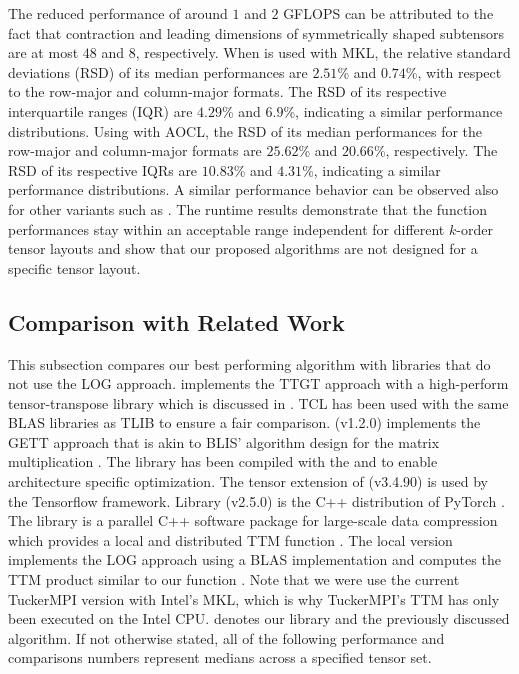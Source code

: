 The reduced performance of around $1$ and $2$ GFLOPS can be attributed to the fact that contraction and leading dimensions of symmetrically shaped subtensors are at most $48$ and $8$, respectively.
When  is used with MKL, the relative standard deviations (RSD) of its median performances are $2.51$\% and $0.74$\%, with respect to the row-major and column-major formats.
The RSD of its respective interquartile ranges (IQR) are $4.29$\% and $6.9$\%, indicating a similar performance distributions.
Using  with AOCL, the RSD of its median performances for the row-major and column-major formats are $25.62$\% and $20.66$\%, respectively.
The RSD of its respective IQRs are $10.83$\% and $4.31$\%, indicating a similar performance distributions.
A similar performance behavior can be observed also for other  variants such as .
The runtime results demonstrate that the function performances stay within an acceptable range independent for different $k$-order tensor layouts and show that our proposed algorithms are not designed for a specific tensor layout.






\subsection{Comparison with Related Work}
This subsection compares our best performing algorithm with libraries that do not use the LOG approach.
 implements the TTGT approach with a high-perform tensor-transpose library  which is discussed in \cite{springer:2018:design}.
TCL has been used with the same BLAS libraries as TLIB to ensure a fair comparison.
 (v1.2.0) implements the GETT approach that is akin to BLIS' algorithm design for the matrix multiplication \cite{matthews:2018:high}.
The library has been compiled with the  and  to enable architecture specific optimization.
The tensor extension of  (v3.4.90) is used by the Tensorflow framework.
Library  (v2.5.0) is the C++ distribution of PyTorch \cite{paszke:2019:pytorch}.
The  library is a parallel C++ software package for large-scale data compression which provides a local and distributed TTM function \cite{ballard:2020:tuckermpi}.
The local version implements the LOG approach using a BLAS implementation and computes the TTM product similar to our function .
Note that we were use the current TuckerMPI version with Intel's MKL, which is why TuckerMPI's TTM has only been executed on the Intel CPU.
 denotes our library and the previously discussed  algorithm.
If not otherwise stated, all of the following performance and comparisons numbers represent medians across a specified tensor set.

